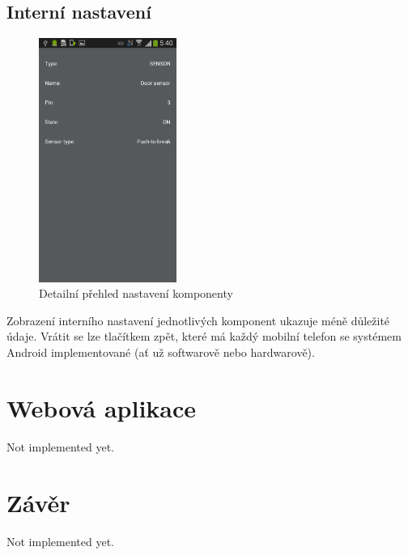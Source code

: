 \documentclass[FM,DP]{tulthesis}  %
\begin{document}
\section{Interní nastavení}
\begin{figure}[H]
\begin{center}
\includegraphics[width=0.4\textwidth]{images/app2.png}
\caption{Detailní přehled nastavení komponenty}
\label{image}
\end{center}
\end{figure}

Zobrazení interního nastavení jednotlivých komponent ukazuje méně důležité údaje. Vrátit se lze tlačítkem zpět, které má každý mobilní telefon se systémem Android implementované (ať už softwarově nebo hardwarově).


\chapter{Webová aplikace}
Not implemented yet.


\chapter{Závěr}
Not implemented yet.

\end{document}

